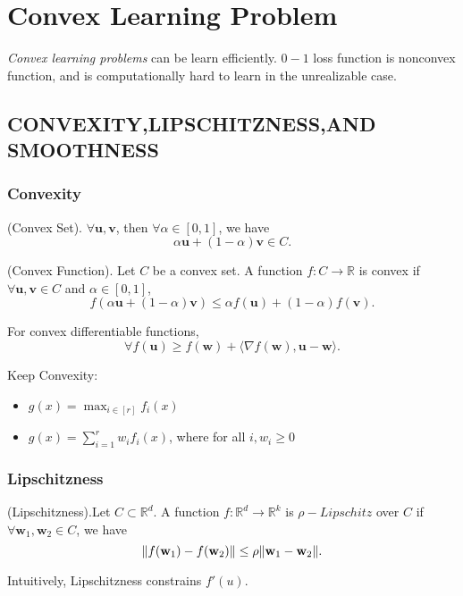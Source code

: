 
\section{Convex Learning Problem}

\emph{Convex learning problems} can be learn efficiently.
$ 0-1 $ loss function is nonconvex function, and is computationally hard to learn in the unrealizable case.

\subsection{CONVEXITY,LIPSCHITZNESS,AND SMOOTHNESS}

\subsubsection{Convexity}

\begin{defn}
	(Convex Set). $ \forall \mathbf{u},\mathbf{v}$, then $ \forall \alpha \in [0,1] $, 
	we have  
	\[ \alpha \mathbf{u} + (1-\alpha) \mathbf{v} \in C.\]
\end{defn}

\begin{defn}
	(Convex Function). Let $ C $ be a convex set.
	A function $ f:C \rightarrow \mathbb{R} $ is convex if 
	$ \forall \mathbf{u},\mathbf{v} \in C $ and $ \alpha \in [0,1] $,
	\[ f(\alpha\mathbf{u}+(1-\alpha)\mathbf{v}) \le \alpha f(\mathbf{u}) + (1-\alpha) f(\mathbf{v}).\]
\end{defn}
For convex differentiable functions,
\[ \forall f(\mathbf{u}) \ge f(\mathbf{w}) + \langle \nabla f(\mathbf{w}),\mathbf{u}-\mathbf{w} \rangle.\]

Keep Convexity:
\begin{itemize}
	\item $ g(x) = \max_{ i \in [r] } f_i(x) $ 
	\item $ g(x) = \sum^r_{i=1} w_i f_i(x) $, where for all $ i, w_i \ge 0 $ 
\end{itemize}

\subsubsection{Lipschitzness}

\begin{defn}
	(Lipschitzness).Let $ C \subset \mathbb{R}^d $. A function $ f:\mathbb{R}^d \rightarrow \mathbb{R}^k $ is $ \rho-Lipschitz $ 
	over $ C $ if $ \forall \mathbf{w}_1, \mathbf{w}_2 \in C $, we have
	\[ \Arrowvert f(\mathbf{w}_1) - f(\mathbf{w}_2) \Arrowvert \le \rho \Arrowvert \mathbf{w}_1 - \mathbf{w}_2 \Arrowvert.\]
\end{defn}
Intuitively, Lipschitzness constrains $ f'(u) $. 

